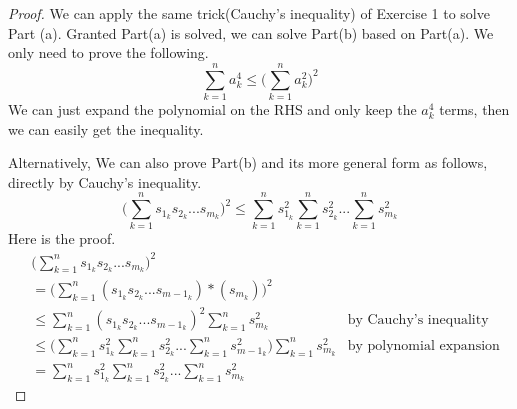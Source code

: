 \documentclass{article}
\begin{document}
\begin{proof}
    We can apply the same trick(Cauchy's inequality) of Exercise 1 to solve Part (a).  Granted Part(a) is solved, we can solve Part(b) based on Part(a). We only need to prove the following.
    \begin{equation*}
        \sum_{k=1}^n{a_k^4} \leq \bigg( \sum_{k=1}^n{a_k^2} \bigg) ^2
    \end{equation*}
    We can just expand the polynomial on the RHS and only keep the $a_k^4$ terms, then we can easily get the inequality.

    Alternatively, We can also prove Part(b) and its more general form as follows, directly by Cauchy's inequality.
    \begin{equation*}
        \bigg( \sum_{k=1}^ns_{1_k}s_{2_k}...s_{m_k} \bigg) ^2
        \leq \sum_{k=1}^n{s_{1_k}^2} \sum_{k=1}^n{s_{2_k}^2} ... \sum_{k=1}^n{s_{m_k}^2}
    \end{equation*}
    Here is the proof.
    \begin{align*}
        & \bigg( \sum_{k=1}^ns_{1_k}s_{2_k}...s_{m_k} \bigg) ^2 \\
        & = \bigg( \sum_{k=1}^n(s_{1_k}s_{2_k}...s_{{m-1}_k})*(s_{m_k}) \bigg) ^2 \\
        & \leq \sum_{k=1}^n{(s_{1_k}s_{2_k}...s_{{m-1}_k})^2} \sum_{k=1}^n{s_{m_k}^2} & \text{by Cauchy's inequality}\\
        & \leq \bigg( \sum_{k=1}^n{s_{1_k}^2} \sum_{k=1}^n{s_{2_k}^2} ... \sum_{k=1}^n{s_{{m-1}_k}^2} \bigg) \sum_{k=1}^n{s_{m_k}^2} & \text{by polynomial expansion}\\
        & = \sum_{k=1}^n{s_{1_k}^2} \sum_{k=1}^n{s_{2_k}^2} ... \sum_{k=1}^n{s_{m_k}^2}
    \end{align*}
\end{proof}
\end{document}
